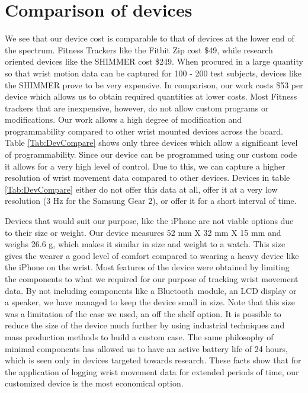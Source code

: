 \section{Comparison of devices}
\label{Sec:Comparison}
We see that our device cost is comparable to that of devices at the lower end of the spectrum.
Fitness Trackers like the Fitbit Zip cost \$49,
while research oriented devices like the SHIMMER cost \$249.
When procured in a large quantity so that wrist motion data can be captured
for 100 - 200 test subjects,
devices like the SHIMMER prove to be very expensive.
In comparison,
our work costs \$53 per device which allows us to obtain required quantities at lower costs.
Most Fitness trackers that are inexpensive, however,
do not allow custom programs or modifications.
Our work allows a high degree of modification and programmability compared to other
wrist mounted devices across the board.
Table \ref{Tab:DevCompare} shows only three devices which allow a significant level of programmability.
Since our device can be programmed using our custom code
it allows for a very high level of control.
Due to this, we can capture a higher resolution of wrist movement data
compared to other devices. Devices in table \ref{Tab:DevCompare} either do not offer this data at all,
offer it at a very low resolution (3 Hz for the Samsung Gear 2), or offer it for a short interval of time.

Devices that would suit our purpose, like the iPhone are not viable options due to their size or weight.
Our device measures 52 mm X 32 mm X 15 mm and weighs 26.6 g,
which makes it similar in size and weight to a watch.
This size gives the wearer a good level of comfort compared to wearing a heavy device like the iPhone on the wrist.
Most features of the device were obtained by limiting the components
to what we required for our purpose of tracking wrist movement data.
By not including components like a Bluetooth\texttrademark~module,
an LCD display or a speaker,
we have managed to keep the device small in size.
Note that this size was a limitation of the case we used,
an off the shelf option.
It is possible to reduce the size of the device much further by using industrial techniques and mass production methods to build a custom case.
The same philosophy of minimal components has allowed us to have an active battery life of 24 hours,
which is seen only in devices targeted towards research.
These facts show that for the application of logging wrist movement data for extended periods of time,
our customized device is the most economical option.

